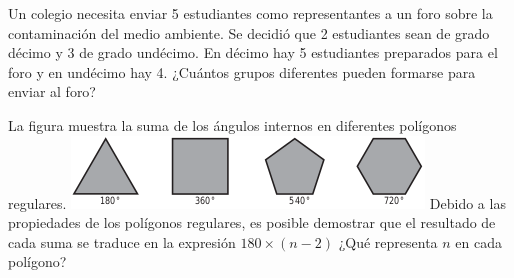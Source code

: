 \documentclass[10pt,addpoints]{exam}
\begin{document}
\begin{questions}
\begin{oneparchoices}
\end{oneparchoices}
\question Un colegio necesita enviar 5 estudiantes como representantes a un foro sobre la contaminación del medio ambiente. Se decidió que 2 estudiantes sean de grado décimo y 3 de grado undécimo. En décimo hay 5 estudiantes preparados para el foro y en undécimo hay 4. ¿Cuántos grupos diferentes pueden formarse para enviar al foro?

\begin{oneparchoices}
\end{oneparchoices}
\question La figura muestra la suma de los ángulos internos en diferentes polígonos regulares.
\includegraphics[scale=.5]{Images/Pantallazo-45.png} 
Debido a las propiedades de los polígonos regulares, es posible demostrar que el resultado de cada suma se traduce en la expresión $180\times (n-2)$ ¿Qué representa $n$ en cada polígono?
\end{questions}
\end{document}
